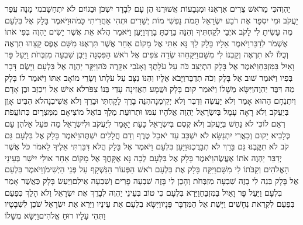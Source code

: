 \documentclass[../main/main.tex]{subfiles}
\begin{document}
\begin{multicols*}{\ncols}
יַהְוֶה\PreVerseSpace{}כִּי מֵרֹאשׁ צֻרִים אֶרְאֶנּוּ וּמִגְּבָעוֹת אֲשׁוּרֶנּוּ הֶן עָם לְבָדָד יִשְׁכֹּן וּבַגּוֹיִם לֹא יִתְחַשָּׁב\PreVerseSpace{}מִי מָנָה עֲפַר יַעֲקֹב וּמִי יִסְפָּר\SubEnd{} אֶת רֹבַע יִשְׂרָאֵל תָּמֹת נַפְשִׁי מוֹת יְשָׁרִים וּתְהִי אַחֲרִיתִי כָּמֹהוּ\PreVerseSpace{}וַיֹּאמֶר בָּלָק אֶל בִּלְעָם מֶה עָשִׂיתָ לִי לָקֹב אֹיְבַי לְקַחְתִּיךָ וְהִנֵּה בֵּרַכְתָּ בָרֵךְ\PreVerseSpace{}וַיַּעַן וַיֹּאמַר הֲלֹא אֵת אֲשֶׁר יָשִׂים יַהְוֶה בְּפִי אֹתוֹ אֶשְׁמֹר לְדַבֵּר\PreVerseSpace{}וַיֹּאמֶר אֵלָיו בָּלָק לֵךְ נָּא אִתִּי אֶל מָקוֹם אַחֵר אֲשֶׁר תִּרְאֶנּוּ מִשָּׁם אֶפֶס קָצֵהוּ תִרְאֶה וְכֻלּוֹ לֹא תִרְאֶה וְקָבְנוֹ לִי מִשָּׁם\PreVerseSpace{}וַיִּקָּחֵהוּ שְׂדֵה צֹפִים אֶל רֹאשׁ הַפִּסְגָּה וַיִּבֶן שִׁבְעָה מִזְבְּחֹת וַיַּעַל פָּר וָאַיִל בַּמִּזְבֵּחַ\PreVerseSpace{}וַיֹּאמֶר אֶל בָּלָק הִתְיַצֵּב כֹּה עַל עֹלָתֶךָ וְאָנֹכִי אִקָּרֶה כֹּה\PreVerseSpace{}וַיִּקָּר יַהְוֶה אֶל בִּלְעָם וַיָּשֶׂם דָּבָר בְּפִיו וַיֹּאמֶר שׁוּב אֶל בָּלָק וְכֹה תְדַבֵּר\PreVerseSpace{}וַיָּבֹא אֵלָיו וְהִנּוֹ נִצָּב עַל עֹלָתוֹ וְשָׂרֵי מוֹאָב אִתּוֹ וַיֹּאמֶר לוֹ בָּלָק מַה דִּבֶּר יַהְוֶה\PreVerseSpace{}וַיִּשָּׂא מְשָׁלוֹ וַיֹּאמַר קוּם בָּלָק וּשֲׁמָע הַאֲזִינָה עָדַי בְּנוֹ צִפֹּר\PreVerseSpace{}לֹא אִישׁ אֵל וִיכַזֵּב וּבֶן אָדָם וְיִתְנֶחָם הַהוּא אָמַר וְלֹא יַעֲשֶׂה וְדִבֶּר וְלֹא יְקִימֶנָּה\PreVerseSpace{}הִנֵּה בָרֵךְ לָקָחְתִּי וּבֵרֵךְ וְלֹא אֲשִׁיבֶנָּה\PreVerseSpace{}לֹא הִבִּיט אָוֶן בְּיַעֲקֹב וְלֹא רָאָה עָמָל בְּיִשְׂרָאֵל יַהְוֶה אֱלֹהָיו עִמּוֹ וּתְרוּעַת מֶלֶךְ בּוֹ\PreVerseSpace{}אֵל מוֹצִיאָם מִמִּצְרָיִם כְּתוֹעֲפֹת רְאֵם לוֹ\PreVerseSpace{}כִּי לֹא נַחַשׁ בְּיַעֲקֹב וְלֹא קֶסֶם בְּיִשְׂרָאֵל כָּעֵת יֵאָמֵר לְיַעֲקֹב וּלְיִשְׂרָאֵל מַה פֹּעֵל\SubEnd{} אֵל\PreVerseSpace{}הֶן עָם כְּלָבִיא יָקוּם וְכַאֲרִי יִתְנַשָּׂא לֹא יִשְׁכַּב עַד יֹאכַל טֶרֶף וְדַם חֲלָלִים יִשְׁתֶּה\PreVerseSpace{}וַיֹּאמֶר בָּלָק אֶל בִּלְעָם גַּם קֹב לֹא תִקֳּבֶנּוּ גַּם בָּרֵךְ לֹא תְבָרֲכֶנּוּ\PreVerseSpace{}וַיַּעַן בִּלְעָם וַיֹּאמֶר אֶל בָּלָק הֲלֹא דִּבַּרְתִּי אֵלֶיךָ לֵאמֹר כֹּל אֲשֶׁר יְדַבֵּר יַהְוֶה אֹתוֹ אֶעֱשֶׂה\PreVerseSpace{}וַיֹּאמֶר בָּלָק אֶל בִּלְעָם לְכָה נָּא אֶקָּחֲךָ אֶל מָקוֹם אַחֵר אוּלַי יִישַׁר בְּעֵינֵי הָאֱלֹהִים וְקַבֹּתוֹ לִי מִשָּׁם\PreVerseSpace{}וַיִּקַּח בָּלָק אֶת בִּלְעָם רֹאשׁ הַפְּעוֹר הַנִּשְׁקָף עַל פְּנֵי הַיְשִׁימֹן\PreVerseSpace{}וַיֹּאמֶר בִּלְעָם אֶל בָּלָק בְּנֵה לִי בָזֶה שִׁבְעָה מִזְבְּחֹת וְהָכֵן לִי בָּזֶה שִׁבְעָה פָרִים וְשִׁבְעָה אֵילִם\PreVerseSpace{}וַיַּעַשׂ בָּלָק כַּאֲשֶׁר אָמַר בִּלְעָם וַיַּעַל פָּר וָאַיִל בַּמִּזְבֵּחַ\PreChapterSpace{}וַיַּרְא בִּלְעָם כִּי טוֹב בְּעֵינֵי יַהְוֶה לְבָרֵךְ אֶת יִשְׂרָאֵל וְלֹא הָלַךְ כְּפַעַם בְּפַעַם לִקְרַאת נְחָשִׁים וַיָּשֶׁת אֶל הַמִּדְבָּר פָּנָיו\PreVerseSpace{}וַיִּשָּׂא בִלְעָם אֶת עֵינָיו וַיַּרְא אֶת יִשְׂרָאֵל שֹׁכֵן לִשְׁבָטָיו וַתְּהִי עָלָיו רוּחַ אֱלֹהִים\PreVerseSpace{}וַיִּשָּׂא מְשָׁלוֹ 
\end{multicols*}
\end{document}
